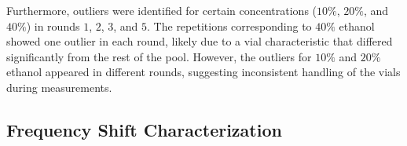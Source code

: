 \documentclass[journal,twoside,web]{ieeecolor}
\begin{document}
Furthermore, outliers were identified for certain concentrations ($10\%$, $20\%$, and $40\%$) in rounds $1$, $2$, $3$, and $5$. The repetitions corresponding to $40\%$ ethanol showed one outlier in each round, likely due to a vial characteristic that differed significantly from the rest of the pool. However, the outliers for $10\%$ and $20\%$ ethanol appeared in different rounds, suggesting inconsistent handling of the vials during measurements.

\subsection{Frequency Shift Characterization}
\label{ssec:sysCharac}
\begin{figure}[!t]
	\centering

\end{figure}
\end{document}

